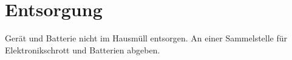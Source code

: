 \section{Entsorgung}
\label{sec:disposal}
Gerät und Batterie nicht im Hausmüll entsorgen. An einer Sammelstelle für Elektronikschrott und
Batterien abgeben.
